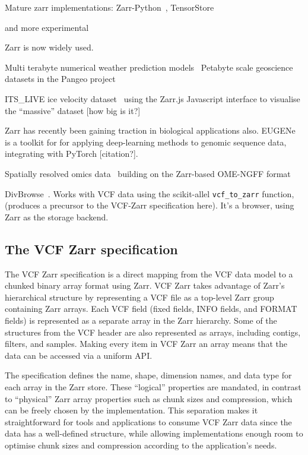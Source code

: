 \documentclass[a4paper,num-refs]{oup-contemporary}
\begin{document}
Mature zarr implementations: Zarr-Python~\citep{zarrpython},
TensorStore~\citep{tensorstore}

and more experimental~\citep[e.g.][]{xtensor_zarr}


Zarr is now widely used.

Multi terabyte numerical weather prediction models~\citep{gowan2022using}
Petabyte scale geoscience datasets in the Pangeo project

ITS\_LIVE ice velocity dataset~\citep{fahnestock2023mappin} using 
the Zarr.js Javascript interface to visualise the ``massive''
dataset [how big is it?]

Zarr has recently been gaining traction in biological applications
also. EUGENe~\citep{klie2023predictive} is a toolkit for 
for applying deep-learning methods to genomic sequence data,
integrating with PyTorch [citation?].

Spatially resolved omics data~\citep{baker2023emobject,marconato2024spatialdata}
building on the Zarr-based OME-NGFF format~\citep{moore2023ome,rzepka2023toward}

DivBrowse~\citep{konig2023divbrowse}. Works with VCF data using 
the scikit-allel \texttt{vcf\_to\_zarr} function, (produces 
a precursor to the VCF-Zarr specification here). It's a 
browser, using Zarr as the storage backend.

\subsection{The VCF Zarr specification}
The VCF Zarr specification is a direct mapping from the VCF data model
to a chunked binary array format using Zarr. VCF Zarr takes advantage
of Zarr's hierarchical structure by representing a VCF file as a top-level
Zarr group containing Zarr arrays. Each VCF field (fixed fields, INFO fields,
and FORMAT fields) is represented as a separate array in the Zarr hierarchy.
Some of the structures from the VCF header are also represented as arrays,
including contigs, filters, and samples. Making every item in VCF Zarr an
array means that the data can be accessed via a uniform API.


The specification defines the name, shape, dimension names, and data type
for each array in the Zarr store. These ``logical'' properties are mandated,
in contrast to ``physical'' Zarr array properties such as chunk sizes and
compression, which can be freely chosen by the implementation. This
separation makes it straightforward for tools and applications to consume
VCF Zarr data since the data has a well-defined structure, while allowing
implementations enough room to optimise chunk sizes and compression
according to the application's needs.
\end{document}
